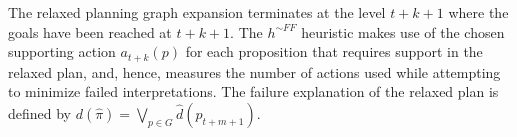 \documentclass[letterpaper]{article}
\def\und#1{\noindent{\bf #1}:}
\begin{document}
%
%
%



 The relaxed planning graph expansion terminates
at the level $t+k+1$ where the goals have
been reached at $t+k+1$. The $h^{\sim FF}$ heuristic makes use of the chosen
supporting action $a_{t+k}(p)$ for each proposition that requires support in the relaxed
plan, and, hence, measures the number of actions used while attempting to
minimize failed interpretations.  The failure explanation of the relaxed plan is
defined by $d(\hat{\pi}) = \bigvee\limits_{p \in G} \hat{d}(p_{t+m+1})$.
\end{document}
